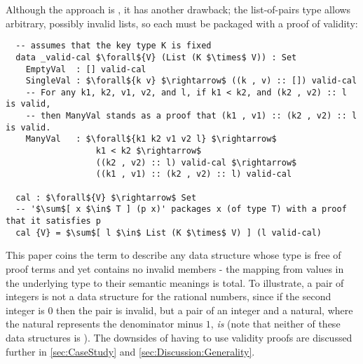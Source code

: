 Although the \cal{} approach is \extensional, it has another drawback; the list-of-pairs type allows arbitrary, possibly invalid lists, so each \cal{} must be packaged with a proof of validity:
\begin{minipage}{\linewidth}
\begin{lstlisting}
  -- assumes that the key type K is fixed
  data _valid-cal $\forall${V} (List (K $\times$ V)) : Set
    EmptyVal  : [] valid-cal
    SingleVal : $\forall${k v} $\rightarrow$ ((k , v) :: []) valid-cal
    -- For any k1, k2, v1, v2, and l, if k1 < k2, and (k2 , v2) :: l is valid,
    -- then ManyVal stands as a proof that (k1 , v1) :: (k2 , v2) :: l is valid.
    ManyVal   : $\forall${k1 k2 v1 v2 l} $\rightarrow$
                  k1 < k2 $\rightarrow$
                  ((k2 , v2) :: l) valid-cal $\rightarrow$
                  ((k1 , v1) :: (k2 , v2) :: l) valid-cal

  cal : $\forall${V} $\rightarrow$ Set
  -- '$\sum$[ x $\in$ T ] (p x)' packages x (of type T) with a proof that it satisfies p
  cal {V} = $\sum$[ l $\in$ List (K $\times$ V) ] (l valid-cal)
\end{lstlisting}
\end{minipage}

This paper coins the term \firstUseGoal{\semanticallyTotal} to describe any data structure whose type is free of proof terms and yet contains no invalid members -
%
\ie{} the mapping from values in the underlying type to their semantic meanings is total.
%
To illustrate, a pair of integers is not a \semanticallyTotal{} data structure for the rational numbers, since if the second integer is $0$ then the pair is invalid,
%
but a pair of an integer and a natural, where the natural represents the denominator minus $1$, \emph{is} \semanticallyTotal{} (note that neither of these data structures is \extensional).
%
The downsides of having to use validity proofs are discussed further in \autoref{sec:CaseStudy} and \autoref{sec:Discussion:Generality}.

\subsubsection{\Fpfs}

